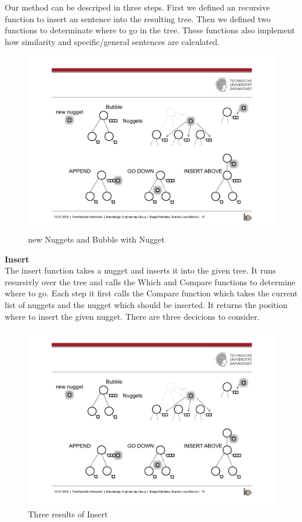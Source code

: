 
Our method can be descriped in three steps. First we defined an recursive function to insert an sentence into the resulting tree. Then we defined two functions to determinate where to go in the tree. These functions also implement how similarity and specific/general sentences are calculated.

\begin{figure}[H]
	\centering
	\includegraphics[trim=3cm 10cm 15cm 5.8cm, clip=true]{img/step2_func.pdf}
	\caption{new Nuggets and Bubble with Nugget}
	\label{fig:jsd}
\end{figure}
\textbf{Insert}\\

The insert function takes a nugget and inserts it into the given tree. It runs resursivly over the tree and calls the Which and Compare functions to determine where to go. Each step it first calls the Compare function which takes the current list of nuggets and the nugget which should be inserted. It returns the position where to insert the given nugget. There are three decicions to consider.
\begin{figure}[H]
	\centering
	\includegraphics[trim=3cm 3cm 3cm 11cm, clip=true, width= \textwidth]{img/step2_func.pdf}
	\caption{Three results of Insert}
	\label{fig:jsd}
\end{figure}

